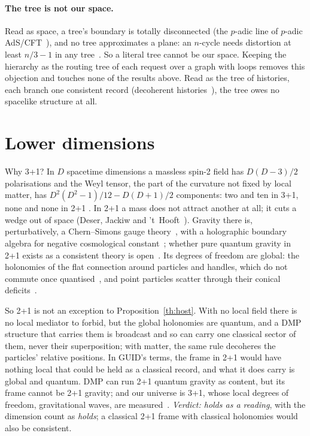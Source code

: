 \paragraph{The tree is not our space.} Read as space, a tree's boundary is totally disconnected (the $p$-adic line of $p$-adic
AdS/CFT~\cite{hmss,gubser}), and no tree approximates a plane: an $n$-cycle needs distortion at least $n/3-1$ in any tree~\cite{rr}. So a
literal tree cannot be our space. Keeping the hierarchy as the routing tree of each request over a graph with loops removes this objection
and touches none of the results above. Read as the tree of histories, each branch one consistent record (decoherent
histories~\cite{gellmannhartle}), the tree owes no spacelike structure at all.

\section{Lower dimensions}\label{sec:21}

Why 3+1? In $D$ spacetime dimensions a massless spin-2 field has $D(D-3)/2$ polarisations and the Weyl tensor, the part of the curvature
not fixed by local matter, has $D^2(D^2-1)/12-D(D+1)/2$ components: two and ten in 3+1, none and none in 2+1 . In 2+1 a mass does not
attract another at all; it cuts a wedge out of space (Deser, Jackiw and 't~Hooft~\cite{djt}). Gravity there is, perturbatively, a
Chern--Simons gauge theory~\cite{witten88}, with a holographic boundary algebra for negative cosmological constant~\cite{bh}; whether pure
quantum gravity in 2+1 exists as a consistent theory is open~\cite{mw}. Its degrees of freedom are global: the holonomies of the flat
connection around particles and handles, which do not commute once quantised~\cite{nr}, and point particles scatter through their conical
deficits~\cite{thooft88}.

So 2+1 is not an exception to Proposition~\ref{th:host}. With no local field there is no local mediator to forbid, but the global holonomies are
quantum, and a DMP structure that carries them is broadcast and so can carry one classical sector of them, never their superposition; with
matter, the same rule decoheres the particles' relative positions. In GUID's terms, the frame in 2+1 would have nothing local
that could be held as a classical record, and what it does carry is global and quantum. DMP can run 2+1 quantum gravity as content, but
its frame cannot be 2+1 gravity;
and our universe is 3+1, whose local degrees of freedom, gravitational waves, are measured~\cite{gw150914}. \emph{Verdict: holds as a reading}, with
the dimension count as \emph{holds}; a classical 2+1 frame with classical holonomies would also be consistent.


